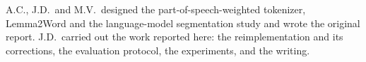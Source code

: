 A.C., J.D.\ and M.V.\ designed the part-of-speech-weighted tokenizer, Lemma2Word and the language-model segmentation study and wrote the original report.
J.D.\ carried out the work reported here: the reimplementation and its corrections, the evaluation protocol, the experiments, and the writing.

